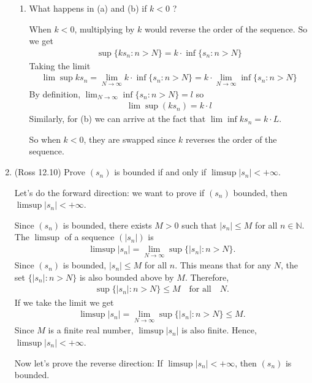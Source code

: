 \documentclass [10pt]{article}
\newcommand{\jg}[1]{{\color{blue} #1}}
\begin{document}
\begin{enumerate}
\begin{enumerate}
\item What happens in (a) and (b) if $k<0$ ?

\jg{
When $k<0$, multiplying by $k$ would reverse the order of the sequence. So we get 
\begin{align*}
    \sup \{ k s_n : n > N \} = k \cdot \inf \{ s_n : n > N \}
\end{align*}
Taking the limit 
\begin{align*}
    \lim \sup k s_n = \lim_{N \rightarrow \infty} k \cdot \inf \{ s_n : n > N \} = k \cdot \lim_{N \rightarrow \infty} \inf \{ s_n : n > N \} 
\end{align*}
By definition, $\lim_{N \rightarrow \infty} \inf \{ s_n : n > N \} = l$ so
\begin{align*}
    \lim \sup (k s_n) = k \cdot l
\end{align*}
Similarly, for (b) we can arrive at the fact that $\lim \inf k s_n = k \cdot L$. 

So when $k < 0$, they are swapped since $k$ reverses the order of the sequence. 
}
\end{enumerate}
\clearpage

\item (Ross 12.10) Prove $\left(s_n\right)$ is bounded if and only if $\limsup|
s_n|<+\infty$.

\jg{
Let's do the forward direction: we want to prove if $(s_n)$ bounded, then $\limsup |s_n| < + \infty$. 

Since $(s_n)$ is bounded, there exists $M > 0$ such that $|s_n| \leq M$ for all $n \in \mathbb{N}$. The $\limsup$ of a sequence $(|s_n|)$ is 
\begin{align*}
    \limsup |s_n| = \lim_{N \rightarrow \infty} \sup \{ |s_n| : n > N \}.
\end{align*}
Since $(s_n)$ is bounded, $|s_n| \leq M$ for all $n$. This means that for any $N$, the set $\{|s_n| : n > N \}$ is also bounded above by $M$. Therefore,
\begin{align*}
    \sup \{ |s_n| : n > N \} \leq M \quad \text{for all} \quad N.
\end{align*}
If we take the limit we get
\begin{align*}
    \limsup |s_n| = \lim_{N \rightarrow \infty} \sup \{ |s_n| : n > N \} \leq M. 
\end{align*}
Since $M$ is a finite real number, $\limsup |s_n|$ is also finite. Hence, $\limsup |s_n| < + \infty$. 

Now let's prove the reverse direction: If $\limsup |s_n| < + \infty$, then $(s_n)$ is bounded. 

}
\end{enumerate}
\end{document}
